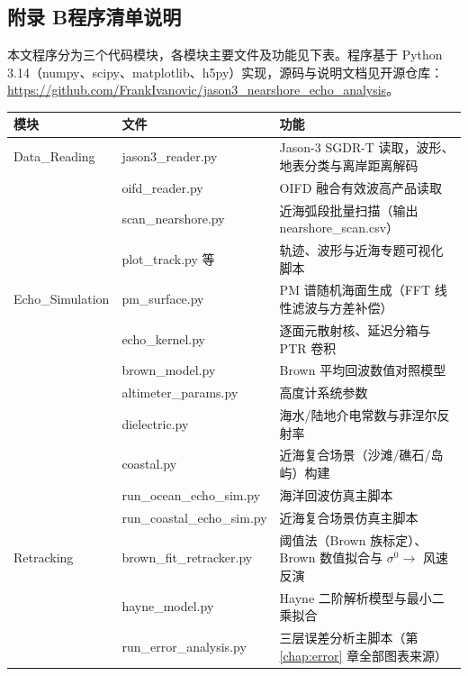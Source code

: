 \documentclass[a4paper]{article}
\newcommand{\song}{\CJKfamily{song}}
\newcommand{\xiaosihao}{\fontsize{12pt}{18pt}\selectfont}
\newcommand{\wuhao}{\fontsize{10.5pt}{18pt}\selectfont}
\newcommand\seccontent{
	\song
	\xiaosihao
    \setlength{\parindent}{2em}
    \setlength{\parskip}{0pt}
    }
\begin{document}
\subsection*{附录 B\quad 程序清单说明}
\seccontent
本文程序分为三个代码模块，各模块主要文件及功能见下表。程序基于 Python 3.14（numpy、scipy、matplotlib、h5py）实现，源码与说明文档见开源仓库：\url{https://github.com/FrankIvanovic/jason3_nearshore_echo_analysis}。

\begin{table}[H]
	\centering
	\song\wuhao
	\begin{tabular}{p{2.8cm}p{3.8cm}p{7.0cm}}
		\toprule
		模块 & 文件 & 功能 \\
		\hline
		Data\_Reading & jason3\_reader.py & Jason-3 SGDR-T 读取，波形、地表分类与离岸距离解码 \\
		 & oifd\_reader.py & OIFD 融合有效波高产品读取 \\
		 & scan\_nearshore.py & 近海弧段批量扫描（输出 nearshore\_scan.csv） \\
		 & plot\_track.py 等 & 轨迹、波形与近海专题可视化脚本 \\
		Echo\_Simulation & pm\_surface.py & PM 谱随机海面生成（FFT 线性滤波与方差补偿） \\
		 & echo\_kernel.py & 逐面元散射核、延迟分箱与 PTR 卷积 \\
		 & brown\_model.py & Brown 平均回波数值对照模型 \\
		 & altimeter\_params.py & 高度计系统参数 \\
		 & dielectric.py & 海水/陆地介电常数与菲涅尔反射率 \\
		 & coastal.py & 近海复合场景（沙滩/礁石/岛屿）构建 \\
		 & run\_ocean\_echo\_sim.py & 海洋回波仿真主脚本 \\
		 & run\_coastal\_echo\_sim.py & 近海复合场景仿真主脚本 \\
		Retracking & brown\_fit\_retracker.py & 阈值法（Brown 族标定）、Brown 数值拟合与 $\sigma^0 \to$ 风速反演 \\
		 & hayne\_model.py & Hayne 二阶解析模型与最小二乘拟合 \\
		 & run\_error\_analysis.py & 三层误差分析主脚本（第 \ref{chap:error} 章全部图表来源） \\
		\bottomrule
	\end{tabular}
\end{table}
\end{document}
